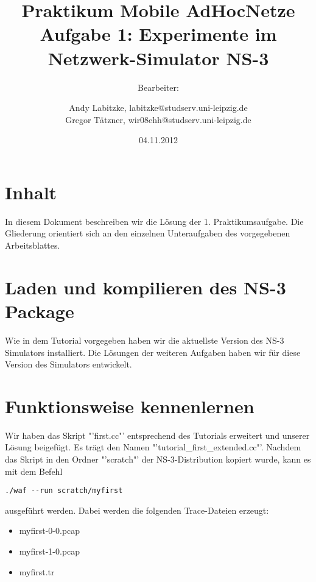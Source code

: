 \documentclass[12pt,a4paper,titlepage]{article}
\begin{document}
\title{Praktikum Mobile AdHocNetze\\
	Aufgabe 1: Experimente im Netzwerk-Simulator NS-3}
\author{
Bearbeiter: \and
	Andy Labitzke, labitzke@studserv.uni-leipzig.de \\ 
	Gregor Tätzner, wir08ehh@studserv.uni-leipzig.de}
\date{04.11.2012}
\maketitle
\setcounter{page}{1}
\appendix

\section*{Inhalt}
In diesem Dokument beschreiben wir die Lösung der 1. Praktikumsaufgabe. Die Gliederung orientiert sich an den einzelnen Unteraufgaben des vorgegebenen Arbeitsblattes.

\setcounter{section}{0}

\section{Laden und kompilieren des NS-3 Package}

Wie in dem Tutorial vorgegeben haben wir die aktuellste Version des NS-3 Simulators installiert. Die Lösungen der weiteren Aufgaben haben wir für diese Version des Simulators entwickelt.

\section{Funktionsweise kennenlernen}

Wir haben das Skript "'first.cc"' entsprechend des Tutorials erweitert und unserer Lösung beigefügt. Es trägt den Namen "'tutorial\_first\_extended.cc"'.
Nachdem das Skript in den Ordner "'scratch"' der NS-3-Distribution kopiert wurde, kann es mit dem Befehl

\begin{lstlisting}
./waf --run scratch/myfirst
\end{lstlisting}

ausgeführt werden. Dabei werden die folgenden Trace-Dateien erzeugt:

\begin{itemize}
\item myfirst-0-0.pcap
\item myfirst-1-0.pcap
\item myfirst.tr
\end{itemize}
\end{document}
